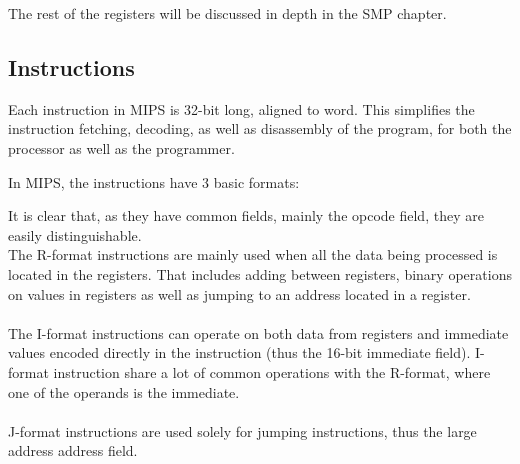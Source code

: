 The rest of the registers will be discussed in depth in the SMP chapter.


\subsection{Instructions}
Each instruction in MIPS is 32-bit long, aligned to word. This simplifies the
instruction fetching, decoding, as well as disassembly of the program, for both
the processor as well as the programmer.

In MIPS, the instructions have 3 basic formats:
\begin{figure}[H]
\centering
{}
\label{fig:instruction_formats}
\end{figure}

It is clear that, as they have common fields, mainly the opcode field, they are
easily distinguishable.\\
The R-format instructions are mainly used when all the data being processed is
located in the registers. That includes adding between registers, binary
operations on values in registers as well as jumping to an address located in
a register.\\\\
The I-format instructions can operate on both data from registers and immediate
values encoded directly in the instruction (thus the 16-bit immediate field).
I-format instruction share a lot of common operations with the R-format, where
one of the operands is the immediate.\\\\
J-format instructions are used solely for jumping instructions, thus the large
address address field.


